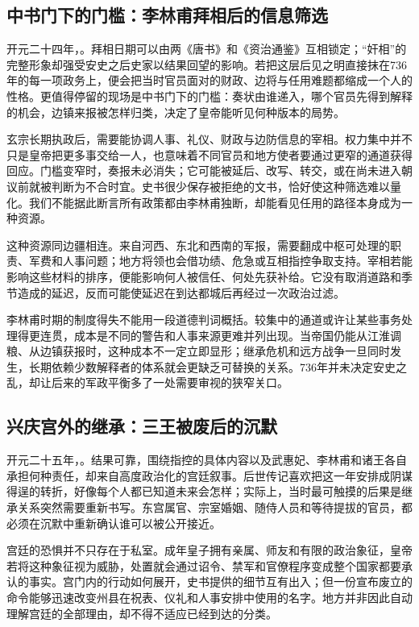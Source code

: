 \subsection{中书门下的门槛：李林甫拜相后的信息筛选}
开元二十四年，。拜相日期可以由两《唐书》和《资治通鉴》互相锁定；“奸相”的完整形象却强受安史之后史家以结果回望的影响。若把这层后见之明直接抹在736年的每一项政务上，便会把当时官员面对的财政、边将与任用难题都缩成一个人的性格。更值得停留的现场是中书门下的门槛：奏状由谁递入，哪个官员先得到解释的机会，边镇来报被怎样归类，决定了皇帝能听见何种版本的局势。

玄宗长期执政后，需要能协调人事、礼仪、财政与边防信息的宰相。权力集中并不只是皇帝把更多事交给一人，也意味着不同官员和地方使者要通过更窄的通道获得回应。门槛变窄时，奏报未必消失；它可能被延后、改写、转交，或在尚未进入朝议前就被判断为不合时宜。史书很少保存被拒绝的文书，恰好使这种筛选难以量化。我们不能据此断言所有政策都由李林甫独断，却能看见任用的路径本身成为一种资源。

这种资源同边疆相连。来自河西、东北和西南的军报，需要翻成中枢可处理的职责、军费和人事问题；地方将领也会借功绩、危急或互相指控争取支持。宰相若能影响这些材料的排序，便能影响何人被信任、何处先获补给。它没有取消道路和季节造成的延迟，反而可能使延迟在到达都城后再经过一次政治过滤。

李林甫时期的制度得失不能用一段道德判词概括。较集中的通道或许让某些事务处理得更连贯，成本是不同的警告和人事来源更难并列出现。当帝国仍能从江淮调粮、从边镇获报时，这种成本不一定立即显形；继承危机和远方战争一旦同时发生，长期依赖少数解释者的体系就会更缺乏可替换的关系。736年并未决定安史之乱，却让后来的军政平衡多了一处需要审视的狭窄关口。

\subsection{兴庆宫外的继承：三王被废后的沉默}
开元二十五年，。结果可靠，围绕指控的具体内容以及武惠妃、李林甫和诸王各自承担何种责任，却来自高度政治化的宫廷叙事。后世传记喜欢把这一年安排成阴谋得逞的转折，好像每个人都已知道未来会怎样；实际上，当时最可触摸的后果是继承关系突然需要重新书写。东宫属官、宗室婚姻、随侍人员和等待提拔的官员，都必须在沉默中重新确认谁可以被公开接近。

宫廷的恐惧并不只存在于私室。成年皇子拥有亲属、师友和有限的政治象征，皇帝若将这种象征视为威胁，处置就会通过诏令、禁军和官僚程序变成整个国家都要承认的事实。宫门内的行动如何展开，史书提供的细节互有出入；但一份宣布废立的命令能够迅速改变州县在祝表、仪礼和人事安排中使用的名字。地方并非因此自动理解宫廷的全部理由，却不得不适应已经到达的分类。

